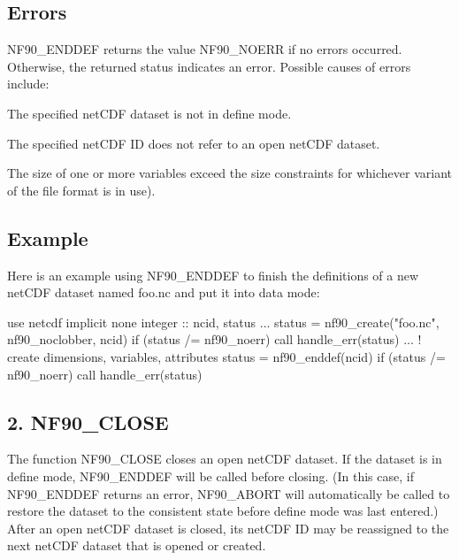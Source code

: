\subsection*{Errors}

N\+F90\+\_\+\+E\+N\+D\+D\+EF returns the value N\+F90\+\_\+\+N\+O\+E\+RR if no errors occurred. Otherwise, the returned status indicates an error. Possible causes of errors include\+:


\begin{DoxyItemize}
\item The specified net\+C\+DF dataset is not in define mode.
\item The specified net\+C\+DF ID does not refer to an open net\+C\+DF dataset.
\item The size of one or more variables exceed the size constraints for whichever variant of the file format is in use).
\end{DoxyItemize}

\subsection*{Example}

Here is an example using N\+F90\+\_\+\+E\+N\+D\+D\+EF to finish the definitions of a new net\+C\+DF dataset named foo.\+nc and put it into data mode\+:


\begin{DoxyCode}
\textcolor{keywordtype}{use }netcdf
\textcolor{keywordtype}{implicit none}
\textcolor{keywordtype}{integer} :: ncid, status
...
status = nf90\_create(\textcolor{stringliteral}{"foo.nc"}, nf90\_noclobber, ncid)
\textcolor{keywordflow}{if} (status /= nf90\_noerr) \textcolor{keyword}{call }handle\_err(status)
...  \textcolor{comment}{!  create dimensions, variables, attributes}
status = nf90\_enddef(ncid)
\textcolor{keywordflow}{if} (status /= nf90\_noerr) \textcolor{keyword}{call }handle\_err(status)
\end{DoxyCode}
\hypertarget{f90_datasets_f90-nf90_close}{}\subsection{2. N\+F90\+\_\+\+C\+L\+O\+S\+E }\label{f90_datasets_f90-nf90_close}
The function N\+F90\+\_\+\+C\+L\+O\+SE closes an open net\+C\+DF dataset. If the dataset is in define mode, N\+F90\+\_\+\+E\+N\+D\+D\+EF will be called before closing. (In this case, if N\+F90\+\_\+\+E\+N\+D\+D\+EF returns an error, N\+F90\+\_\+\+A\+B\+O\+RT will automatically be called to restore the dataset to the consistent state before define mode was last entered.) After an open net\+C\+DF dataset is closed, its net\+C\+DF ID may be reassigned to the next net\+C\+DF dataset that is opened or created.

